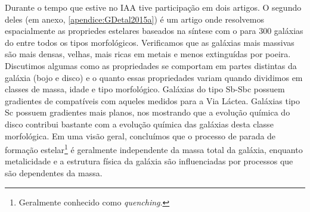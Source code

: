 Durante o tempo que estive no IAA tive participação em dois artigos. O segundo deles
\citep{GonzalezDelgado.etal.2015a} (em anexo, \ref{apendice:GDetal2015a}) é um artigo onde
resolvemos espacialmente as propriedes estelares baseados na síntese com o \starlight para 300
galáxias do \CAL entre todos os tipos morfológicos. Verificamos que as galáxias mais massivas são
mais densas, velhas, mais ricas em metais e menos extinguídas por poeira. Discutimos algumas como as
propriedades se comportam em partes distintas da galáxia (bojo e disco) e o quanto essas
propriedades variam quando dividimos em classes de massa, idade e tipo morfológico. Galáxias do tipo
Sb-Sbc possuem gradientes de  compatíveis com aqueles medidos para a Via Láctea.
Galáxias tipo Sc possuem gradientes mais planos, nos mostrando que a evolução química do disco
contribui bastante com a evolução química das galáxias desta classe morfológica. Em uma visão geral,
concluímos que o processo de parada de formação estelar\footnote{Geralmente conhecido como {\em
quenching}.} é geralmente independente da massa total da galáxia, enquanto metalicidade e a
estrutura física da galáxia são influenciadas por processos que são dependentes da massa.




